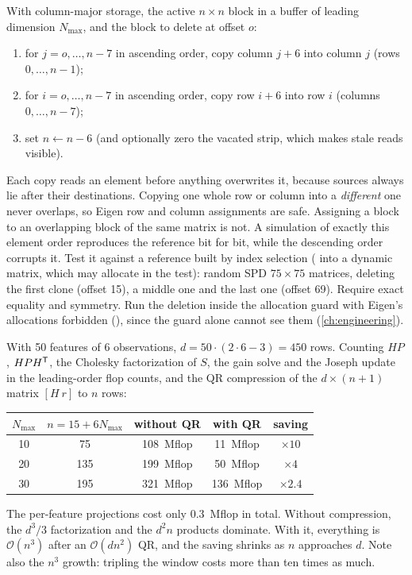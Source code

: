 \begin{solutions}
  \item With column-major storage, the active $n\times n$ block in a buffer of leading dimension $N_{\max}$, and the block to delete at offset $o$:
        \begin{enumerate}[label=(\alph*)]
          \item for $j = o, \dots, n - 7$ in ascending order, copy column $j + 6$ into column $j$ (rows $0, \dots, n - 1$);
          \item for $i = o, \dots, n - 7$ in ascending order, copy row $i + 6$ into row $i$ (columns $0, \dots, n - 7$);
          \item set $n \gets n - 6$ (and optionally zero the vacated strip, which makes stale reads visible).
        \end{enumerate}
        Each copy reads an element before anything overwrites it, because sources always lie after their destinations. Copying one whole row or column into
        a \emph{different} one never overlaps, so Eigen row and column assignments are safe. Assigning a block to an overlapping block of the same matrix is
        not. A simulation of exactly this element order reproduces the reference bit for bit, while the descending order corrupts it. Test it against a
        reference built by index selection ( into a dynamic matrix, which may allocate in the test): random SPD $75\times75$ matrices, deleting the
        first clone (offset 15), a middle one and the last one (offset 69). Require exact equality and symmetry. Run the deletion inside the allocation
        guard with Eigen's allocations forbidden (), since the guard alone cannot see them (\cref{ch:engineering}).

  \item With 50 features of 6 observations, $d = 50\cdot(2\cdot6 - 3) = 450$ rows. Counting $HP$, $HPH^{\mathsf{T}}$, the Cholesky factorization of $S$, the gain solve and the Joseph
        update in the leading-order flop counts, and the QR compression of the $d\times(n + 1)$ matrix $[H\ r]$ to $n$ rows:
        \begin{center}\small
        \begin{tabular}{@{}c c c c c@{}}
        \toprule
        $N_{\max}$ & $n = 15 + 6N_{\max}$ & without QR & with QR & saving \\
        \midrule
        10 & 75 & 108~Mflop & 11~Mflop & $\times10$ \\
        20 & 135 & 199~Mflop & 50~Mflop & $\times4$ \\
        30 & 195 & 321~Mflop & 136~Mflop & $\times2.4$ \\
        \bottomrule
        \end{tabular}
        \end{center}
        The per-feature projections cost only $0.3$~Mflop in total. Without compression, the $d^3/3$ factorization and the $d^2n$ products dominate. With it, everything is
        $\mathcal{O}(n^3)$ after an $\mathcal{O}(dn^2)$ QR, and the saving shrinks as $n$ approaches $d$. Note also the $n^3$ growth: tripling the window costs more than ten times as much.
\end{solutions}
